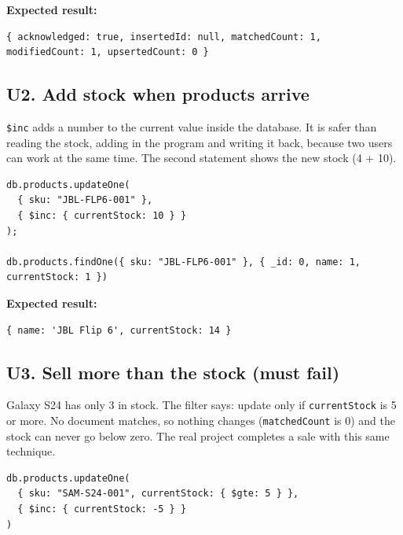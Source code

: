\documentclass[11pt,a4paper]{article}
\newcommand{\code}[1]{\texttt{#1}}
\begin{document}
\noindent\textbf{Expected result:}
\begin{lstlisting}[style=result]
{ acknowledged: true, insertedId: null, matchedCount: 1, modifiedCount: 1, upsertedCount: 0 }
\end{lstlisting}

\subsection*{U2. Add stock when products arrive}
\code{\$inc} adds a number to the current value inside the database. It is safer than reading the stock, adding in the program and writing it back, because two users can work at the same time. The second statement shows the new stock (4 + 10).

\begin{minipage}{\linewidth}
\begin{lstlisting}[style=query]
db.products.updateOne(
  { sku: "JBL-FLP6-001" },
  { $inc: { currentStock: 10 } }
);

db.products.findOne({ sku: "JBL-FLP6-001" }, { _id: 0, name: 1, currentStock: 1 })
\end{lstlisting}
\end{minipage}

\noindent\textbf{Expected result:}
\begin{lstlisting}[style=result]
{ name: 'JBL Flip 6', currentStock: 14 }
\end{lstlisting}

\subsection*{U3. Sell more than the stock (must fail)}
Galaxy S24 has only 3 in stock. The filter says: update only if \code{currentStock} is 5 or more. No document matches, so nothing changes (\code{matchedCount} is 0) and the stock can never go below zero. The real project completes a sale with this same technique.

\begin{minipage}{\linewidth}
\begin{lstlisting}[style=query]
db.products.updateOne(
  { sku: "SAM-S24-001", currentStock: { $gte: 5 } },
  { $inc: { currentStock: -5 } }
)
\end{lstlisting}
\end{minipage}
\end{document}
